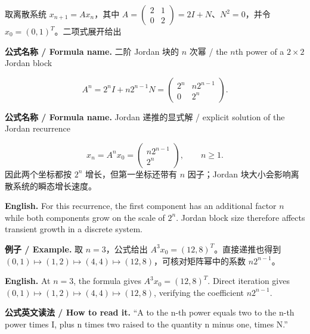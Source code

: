 \documentclass[UTF8,11pt,a4paper]{ctexart}
\newcommand{\EN}[1]{\par\noindent\textbf{English.} #1\par}
\newcommand{\READ}[1]{\par\noindent\textbf{公式英文读法 / How to read it.} #1\par}
\newcommand{\FORMULA}[2]{\par\noindent\textbf{公式名称 / Formula name.} #1 / #2\par}
\newcommand{\EX}[2]{\par\noindent\textbf{例子 / Example.} #1\par\EN{#2}}
\begin{document}
取离散系统 $x_{n+1}=Ax_n$，其中 $A=\begin{pmatrix}2&1\\0&2\end{pmatrix}=2I+N$、$N^2=0$，并令 $x_0=(0,1)^T$。二项式展开给出
\FORMULA{二阶 Jordan 块的 $n$ 次幂}{the $n$th power of a $2\times2$ Jordan block}
\[
A^n=2^nI+n2^{n-1}N
=\begin{pmatrix}2^n&n2^{n-1}\\0&2^n\end{pmatrix}.
\]
\FORMULA{Jordan 递推的显式解}{explicit solution of the Jordan recurrence}
\[
x_n=A^nx_0=\begin{pmatrix}n2^{n-1}\\2^n\end{pmatrix},\qquad n\ge1.
\]
因此两个坐标都按 $2^n$ 增长，但第一坐标还带有 $n$ 因子；Jordan 块大小会影响离散系统的瞬态增长速度。
\EN{For this recurrence, the first component has an additional factor $n$ while both components grow on the scale of $2^n$. Jordan block size therefore affects transient growth in a discrete system.}
\EX{取 $n=3$，公式给出 $A^3x_0=(12,8)^T$。直接递推也得到 $(0,1)\mapsto(1,2)\mapsto(4,4)\mapsto(12,8)$，可核对矩阵幂中的系数 $n2^{n-1}$。}{At $n=3$, the formula gives $A^3x_0=(12,8)^T$. Direct iteration gives $(0,1)\mapsto(1,2)\mapsto(4,4)\mapsto(12,8)$, verifying the coefficient $n2^{n-1}$.}
\READ{``A to the n-th power equals two to the n-th power times I, plus n times two raised to the quantity n minus one, times N.''}
\end{document}
